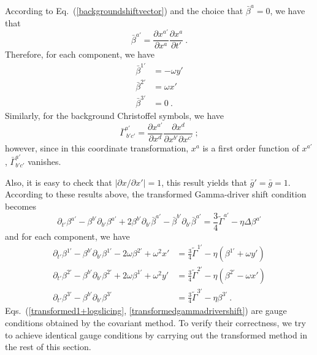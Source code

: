 According to Eq.~(\ref{backgroundshiftvector}) and the choice that ${\bar \beta}^{a} = 0$, we have that
\[
{\bar \beta}^{a'} = \frac{\partial x^{a'}}{\partial x^{a}}\frac{\partial x^{a}}{\partial t'} \ .
\]
Therefore, for each component, we have
\begin{align*}
{\bar \beta}^{1'} & = -\omega y'\\
{\bar \beta}^{2'} & = \omega x'\\
{\bar \beta}^{3'} & = 0 \ .
\end{align*}
Similarly, for the background Christoffel symbols, we have
\[
{\bar \Gamma}^{a'}_{~b'c'} = \frac{\partial x^{a'}}{\partial x^{d}}\frac{\partial x^{d}}{\partial x^{b'}\partial x^{c'}} \ ;
\]
however, since in this coordinate transformation, $x^{a}$ is a first order function of $x^{a'}$, ${\bar \Gamma}^{a'}_{b'c'}$ vanishes. 

Also, it is easy to check that $\left|\partial x/\partial x'\right| = 1$, this result yields that ${\bar g}' = {\bar g} = 1$. According to these results above, the transformed Gamma-driver shift condition becomes
\begin{equation}
\partial_{t'}\beta^{a'} - \beta^{b'}\partial_{b'}\beta^{a'} + 2\beta^{b'}\partial_{b'}{\bar \beta}^{a'} - {\bar \beta}^{b'}\partial_{b'}{\bar \beta}^{a'} = \frac{3}{4}{\tilde \Gamma}^{a'} - \eta \Delta \beta^{a'}
\end{equation}
and for each component, we have
\begin{subequations}\label{transformedgammadrivershift}
\begin{align}
\partial_{t'}\beta^{1'} - \beta^{b'}\partial_{b'}\beta^{1'} - 2\omega\beta^{2'} + \omega^{2}x' &= \frac{3}{4}{\tilde \Gamma}^{1'} - \eta \left(\beta^{1'} + \omega y'\right)\\
\partial_{t'}\beta^{2'} - \beta^{b'}\partial_{b'}\beta^{2'} + 2\omega\beta^{1'} + \omega^{2}y' &= \frac{3}{4}{\tilde \Gamma}^{2'} - \eta \left(\beta^{2'} - \omega x'\right)\\
\partial_{t'}\beta^{3'} - \beta^{b'}\partial_{b'}\beta^{3'} & = \frac{3}{4}{\tilde \Gamma}^{3'} - \eta \beta^{3'} \ .
\end{align}
\end{subequations}
Eqs.~(\ref{transformed1+logslicing}, \ref{transformedgammadrivershift}) are gauge conditions obtained by the covariant method. To verify their correctness, we try to achieve identical gauge conditions by carrying out the transformed method in the rest of this section. 

